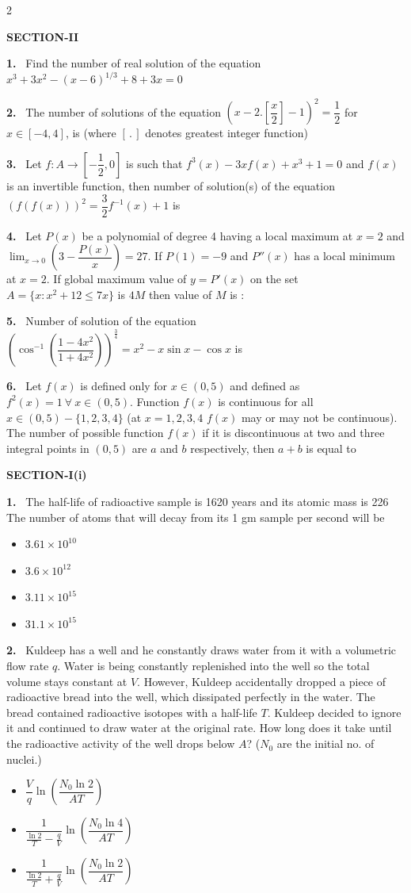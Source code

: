 \documentclass[10pt]{extarticle}
\newcommand{\papersec}[1]{\par\bigskip{\centering\Large\bfseries PAPER-#1\par}\medskip}
\newcommand{\partsec}[2]{\par\medskip\noindent{\large\bfseries PART-#1: #2}\par\smallskip}
\newcommand{\sect}[1]{\par\smallskip\noindent\textbf{#1}\par}
\newcommand{\qn}[1]{\par\smallskip\noindent\textbf{#1.}~}
\newenvironment{qoptions}{\begin{itemize}[leftmargin=1.8em,itemsep=1pt,topsep=2pt,label={}]}{\end{itemize}}
\newcommand{\opt}[2]{\item[(#1)] #2}
\begin{document}
\begin{multicols}{2}
\sect{SECTION-II}
\qn{1} Find the number of real solution of the equation $x^3+3x^2-(x-6)^{1/3}+8+3x=0$
\qn{2} The number of solutions of the equation $\left(x-2.\left[\dfrac x2\right]-1\right)^2=\dfrac12$ for $x\in[-4,4]$, is (where $[\,.\,]$ denotes greatest integer function)
\qn{3} Let $f:A\to\left[-\dfrac12,0\right]$ is such that $f^3(x)-3xf(x)+x^3+1=0$ and $f(x)$ is an invertible function, then number of solution(s) of the equation $(f(f(x)))^2=\dfrac32f^{-1}(x)+1$ is
\qn{4} Let $P(x)$ be a polynomial of degree 4 having a local maximum at $x=2$ and $\displaystyle\lim_{x\to0}\left(3-\dfrac{P(x)}{x}\right)=27$. If $P(1)=-9$ and $P''(x)$ has a local minimum at $x=2$. If global maximum value of $y=P'(x)$ on the set $A=\{x:x^2+12\le7x\}$ is $4M$ then value of $M$ is :
\qn{5} Number of solution of the equation $\left(\cos^{-1}\left(\dfrac{1-4x^2}{1+4x^2}\right)\right)^{\frac34}=x^2-x\sin x-\cos x$ is
\qn{6} Let $f(x)$ is defined only for $x\in(0,5)$ and defined as $f^2(x)=1\ \forall\ x\in(0,5)$. Function $f(x)$ is continuous for all $x\in(0,5)-\{1,2,3,4\}$ (at $x=1,2,3,4$ $f(x)$ may or may not be continuous). The number of possible function $f(x)$ if it is discontinuous at two and three integral points in $(0,5)$ are $a$ and $b$ respectively, then $a+b$ is equal to
\papersec{2}
\partsec{1}{PHYSICS}
\sect{SECTION-I(i)}
\qn{1} The half-life of radioactive sample is 1620 years and its atomic mass is 226 The number of atoms that will decay from its 1 gm sample per second will be
\begin{qoptions}
\opt{A}{$3.61\times10^{10}$}
\opt{B}{$3.6\times10^{12}$}
\opt{C}{$3.11\times10^{15}$}
\opt{D}{$31.1\times10^{15}$}
\end{qoptions}
\qn{2} Kuldeep has a well and he constantly draws water from it with a volumetric flow rate $q$. Water is being constantly replenished into the well so the total volume stays constant at $V$. However, Kuldeep accidentally dropped a piece of radioactive bread into the well, which dissipated perfectly in the water. The bread contained radioactive isotopes with a half-life $T$. Kuldeep decided to ignore it and continued to draw water at the original rate. How long does it take until the radioactive activity of the well drops below $A$? ($N_0$ are the initial no. of nuclei.)
\begin{qoptions}
\opt{A}{$\dfrac{V}{q}\ln\left(\dfrac{N_0\ln2}{AT}\right)$}
\opt{B}{$\dfrac{1}{\frac{\ln2}{T}-\frac{q}{V}}\ln\left(\dfrac{N_0\ln4}{AT}\right)$}
\opt{C}{$\dfrac{1}{\frac{\ln2}{T}+\frac{q}{V}}\ln\left(\dfrac{N_0\ln2}{AT}\right)$}

\end{qoptions}
\end{multicols}
\end{document}
